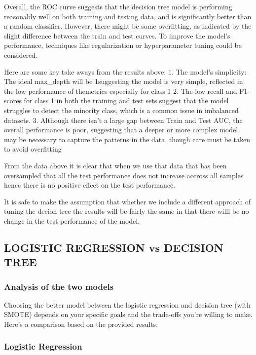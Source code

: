 \documentclass[11pt]{article}
\begin{document}
Overall, the ROC curve suggests that the decision tree model is
performing reasonably well on both training and testing data, and is
significantly better than a random classifier. However, there might be
some overfitting, as indicated by the slight difference between the
train and test curves. To improve the model's performance, techniques
like regularization or hyperparameter tuning could be considered.

Here are some key take aways from the results above: 1. The model's
simplicity: The ideal max\_depth will be 1suggesting the model is very
simple, reflected in the low performance of themetrics especially for
class 1 2. The low recall and F1-scores for class 1 in both the training
and test sets suggest that the model struggles to detect the minority
class, which is a common issue in imbalanced datasets. 3. Although there
isn't a large gap between Train and Test AUC, the overall performance is
poor, suggesting that a deeper or more complex model may be necessary to
capture the patterns in the data, though care must be taken to avoid
overfitting

From the data above it is clear that when we use that data that has been
oversampled that all the test performance does not increase accross all
samples hence there is no positive effect on the test performance.

It is safe to make the assumption that whether we include a different
approach of tuning the decion tree the results will be fairly the same
in that there willl be no change in the test performance of the model.

    \subsection{LOGISTIC REGRESSION vs DECISION
TREE}\label{logistic-regression-vs-decision-tree}

\subsubsection{Analysis of the two
models}\label{analysis-of-the-two-models}

Choosing the better model between the logistic regression and decision
tree (with SMOTE) depends on your specific goals and the trade-offs
you're willing to make. Here's a comparison based on the provided
results:

\subsubsection{Logistic Regression}\label{logistic-regression}
\end{document}
